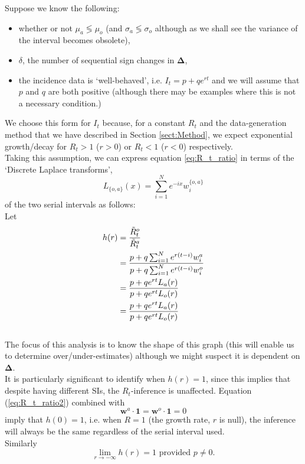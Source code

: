 \documentclass[10pt,journal,compsoc]{IEEEtran}
\begin{document}
Suppose we know the following:

\begin{itemize}
    \item whether or not $\mu_a \mathop{\lessgtr} \mu_o $ (and $\sigma_a \mathop{\lessgtr} \sigma_o$ although as we shall see the variance of the interval becomes obsolete),
    \item $\delta$, the number of sequential sign changes in $\boldsymbol{\Delta}$,
    \item the incidence data is `well-behaved', i.e. $I_t = p+qe^{rt}$ and we will assume that $p$ and $q$ are both positive (although there may be examples where this is not a necessary condition.)
\end{itemize}

We choose this form for $I_t$ because, for a constant $R_t$ and the data-generation method that we have described in Section \ref{sect:Method}, we expect exponential growth/decay for $R_t>1$ ($r>0$) or $R_t<1$ ($r<0$) respectively.\\

Taking this assumption, we can express equation \ref{eq:R_t_ratio} in terms of the `Discrete Laplace transforms',  $$ L_{\{o, a\}}(x) = \sum_{i=1}^{N}e^{-ix}w_i^{\{o, a\}}$$ of the two serial intervals as follows:\\
Let
\begin{align}
h(r) &= \frac{\tilde{R}_t^o}{\tilde{R}_t^a} \notag\\
&= \frac{p + q\sum_{i=1}^N e^{r(t-i)}w_i^a}{p + q\sum_{i=1}^N e^{r(t-i)}w_i^o} \notag\\
&= \frac{p+qe^{rt}L_a(r)}{p+qe^{rt}L_o(r)} \notag\\ 
&= \frac{p+qe^{rt}L_a(r)}{p+qe^{rt}L_o(r)} \label{eq:R_t_ratio2}
\end{align}\\
The focus of this analysis is to know the shape of this graph (this will enable us to determine over/under-estimates) although we might suspect it is dependent on $\boldsymbol{\Delta}$.\\ It is particularly significant to identify when $h(r) = 1$, since this implies that despite having different SIs, the $R_t$-inference is unaffected. Equation (\ref{eq:R_t_ratio2}) combined with $$ \boldsymbol{w}^a \cdot \boldsymbol{1} = \boldsymbol{w}^o \cdot \boldsymbol{1}=0$$ imply that $h(0) = 1$, i.e. when $R=1$ (the growth rate, $r$ is null), the inference will always be the same regardless of the serial interval used.\\
Similarly 
$$\lim_{r \rightarrow -\infty}h(r)=1 \text{ provided }p \neq 0.$$
\end{document}
